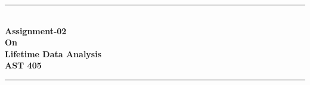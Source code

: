\documentclass[
  12pt,
  oneside]{article}
\author{}
\date{\vspace{-2.5em}}
\begin{document}
%
%
%



\begin{titlepage}

\newcommand{\HRule}{\rule{\linewidth}{0.5mm}} %

\center %

%


\HRule \\[0.25cm]
{ \huge \bfseries Assignment-02}\\[0.04cm]
{ \LARGE \bfseries On}\\[0.04cm]
{ \huge \bfseries Lifetime Data Analysis}\\[0.04cm]
{ \LARGE \bfseries AST 405}\\[0.04cm]
\HRule \\[1.5cm]




\end{titlepage}
\end{document}
